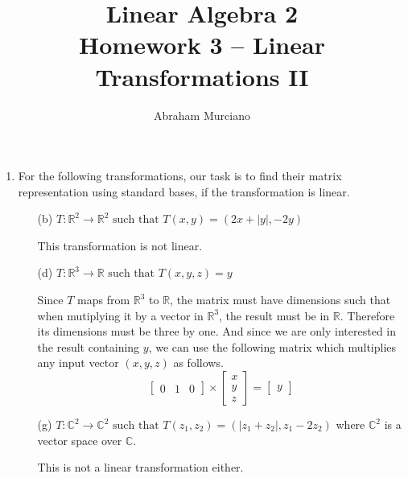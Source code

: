 \documentclass{article}
\title{Linear Algebra 2 \\
\medskip
\large Homework 3 -- Linear Transformations II}
\author{Abraham Murciano}
\newenvironment{answers}{ %
	\begin{enumerate}
		\setlength{\itemsep}{\bigskipamount}
}{\end{enumerate}}
\newcommand{\R}{\mathbb{R}}
\newcommand{\C}{\mathbb{C}}
\newcommand{\st}{\text{ such that }}
\begin{document}
\maketitle

\begin{answers}

	\item
		For the following transformations, our task is to find their matrix representation using standard bases, if the transformation is linear.
		\begin{enumerate}
			\item[(b)]
				\(T : \R^2 \to \R^2 \st T(x, y) = (2x + |y|, -2y)\)

				This transformation is not linear.

			\item[(d)]
				\(T : \R^3 \to \R \st T(x, y, z) = y\)

				Since \(T\) maps from \(\R^3\) to \(\R\), the matrix must have dimensions such that when mutiplying it by a vector in \(\R^3\), the result must be in \(\R\). Therefore its dimensions must be three by one. And since we are only interested in the result containing \(y\), we can use the following matrix which multiplies any input vector \((x, y, z)\) as follows.
				\begin{equation*}
					\left[ \begin{matrix}
							0 & 1 & 0
						\end{matrix} \right]
					\times
					\left[ \begin{matrix}
							x \\ y \\ z
						\end{matrix} \right]
					=
					\left[ \begin{matrix}
							y
						\end{matrix} \right]
				\end{equation*}

			\item[(g)]
				\(T : \C^2 \to \C^2 \st T(z_1, z_2) = (|z_1 + z_2|, z_1 - 2z_2)\) where \(\C^2\) is a vector space over \(\C\).

				This is not a linear transformation either.
		\end{enumerate}
\end{answers}
\end{document}
